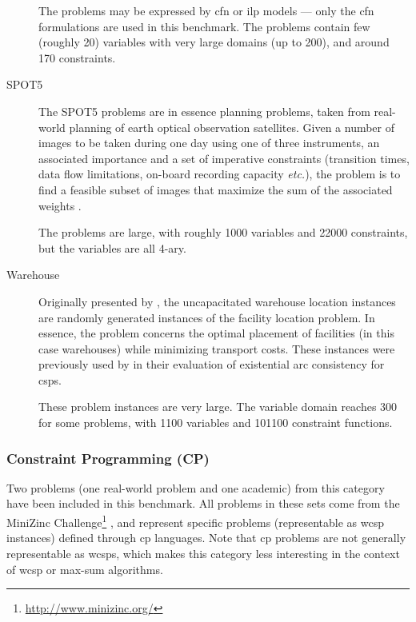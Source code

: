 \begin{description}
		The problems may be expressed by \gls{cfn} or \gls{ilp} models — only the \gls{cfn} formulations are used in this benchmark. The problems contain few (roughly \num{20}) variables with very large domains (up to \num{200}), and around \num{170} constraints.

	\item[SPOT5]
		The SPOT5 problems are in essence planning problems, taken from real-world planning of earth optical observation satellites.
		Given a number of images to be taken during one day using one of three instruments, an associated importance and a set of imperative constraints (transition times, data flow limitations, on-board recording capacity \emph{etc.}), the problem is to find a feasible subset of images that maximize the sum of the associated weights \parencite{Bensana99}.

		The problems are large, with roughly \num{1000} variables and \num{22000} constraints, but the variables are all 4-ary.

	\item[Warehouse]
		Originally presented by \textcite{Kratica01}, the uncapacitated warehouse location instances are randomly generated instances of the facility location problem. In essence, the problem concerns the optimal placement of facilities (in this case warehouses) while minimizing transport costs. These instances were previously used by \textcite{deGivry05} in their evaluation of existential arc consistency for \glspl{csp}.

		These problem instances are very large. The variable domain reaches \num{300} for some problems, with \num{1100} variables and \num{101100} constraint functions.

\end{description}

\subsubsection{Constraint Programming (CP)}
Two problems (one real-world problem and one academic) from this category have been included in this benchmark.
All problems in these sets come from the MiniZinc Challenge\footnote{\url{http://www.minizinc.org/}} \parencite[\pno~5]{deGivry14}, and represent specific problems (representable as \gls{wcsp} instances) defined through \acrlong{cp} languages.
Note that \gls{cp} problems are not generally representable as \glspl{wcsp}, which makes this category less interesting in the context of \gls{wcsp} or max-sum algorithms.

